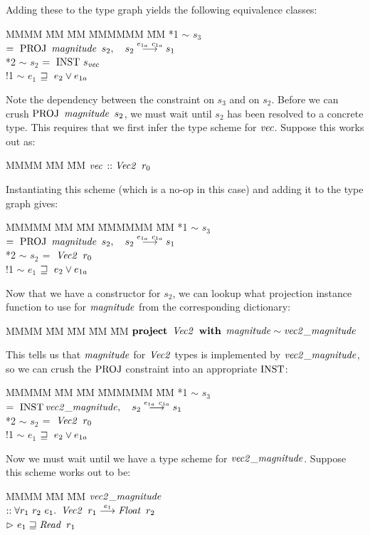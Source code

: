 Adding these to the type graph yields the following equivalence classes:
\begin{tabbing}
MMMM	\= MM 	\= MM 		\= MMMMMM 	\= MM \kill
	\> *1	\> $\sim$	\> $s_3$	\> $= \ \textrm{PROJ} \ \operatorname{\mathit{magnitude}} \ s_2, 
							\quad s_2 \stackrel{e_{1a} \ c_{1a}}{\longrightarrow} s_1$ \\
	\> *2	\> $\sim$	\> $s_2$	\> $= \ \textrm{INST} \ s_{\operatorname{\mathit{vec}}}$ \\
	\> !1	\> $\sim$	\> $e_1$	\> $\sqsupseteq \ e_2 \lor e_{1a}$
\end{tabbing}

Note the dependency between the constraint on $s_3$ and on $s_2$. Before we can crush $\rPROJ \ \imagnitude \ s_2$, we must wait until $s_2$ has been resolved to a concrete type. This requires that we first infer the type scheme for $\operatorname{\mathit{vec}}$. Suppose this works out as:
\begin{tabbing}
MMMM	\= MM \= MM \kill
	\> $\operatorname{\mathit{vec}}$ \> $:: \operatorname{\mathit{Vec2}} \ r_0$ 
\end{tabbing}
Instantiating this scheme (which is a no-op in this case) and adding it to the type graph gives:
\begin{tabbing}
MMMMM	\= MM 	\= MM 		\= MMMMMM 	\= MM \kill
	\> *1	\> $\sim$	\> $s_3$	\> $= \ \textrm{PROJ} \ \operatorname{\mathit{magnitude}} \ s_2, 
							\quad s_2 \stackrel{e_{1a} \ c_{1a}}{\longrightarrow} s_1$ \\
	\> *2	\> $\sim$	\> $s_2$	\> $= \ \operatorname{\mathit{Vec2}} \ r_0$ \\
	\> !1	\> $\sim$	\> $e_1$	\> $\sqsupseteq \ e_2 \lor e_{1a}$
\end{tabbing}
Now that we have a constructor for $s_2$, we can lookup what projection instance function to use for $\operatorname{\mathit{magnitude}}$ from the corresponding dictionary:
\begin{tabbing}
MMMM 	\= MM \= MM \= MM \= MM \kill
	\> $\kproject \ \iVecTwo \ \kwith$ $\operatorname{\mathit{magnitude}} \sim \operatorname{\mathit{vec2\_magnitude}}$ 
\end{tabbing}
This tells us that $\operatorname{\mathit{magnitude}}$ for $\operatorname{\mathit{Vec2}}$ types is implemented by $\operatorname{\mathit{vec2\_magnitude}}$, so we can crush the $\textrm{PROJ}$ constraint into an appropriate $\textrm{INST}$:
\begin{tabbing}
MMMMM	\= MM 	\= MM 		\= MMMMMM 	\= MM \kill
	\> *1	\> $\sim$	\> $s_3$	\> $= \ \textrm{INST} \operatorname{\mathit{vec2\_magnitude}}, 
							\quad s_2 \stackrel{e_{1a} \ c_{1a}}{\longrightarrow} s_1$ \\
	\> *2	\> $\sim$	\> $s_2$	\> $= \ \operatorname{\mathit{Vec2}} \ r_0$ \\
	\> !1	\> $\sim$	\> $e_1$	\> $\sqsupseteq \ e_2 \lor e_{1a}$
\end{tabbing}
Now we must wait until we have a type scheme for $\operatorname{\mathit{vec2\_magnitude}}$. Suppose this scheme works out to be:
\begin{tabbing}
MMMM	\= MM \= MM \kill
	\> $\operatorname{\mathit{vec2\_magnitude}}$ \\
	\> \> $:: \forall r_1 \ r_2 \ e_1. \ \operatorname{\mathit{Vec2}} \ r_1 \stackrel{e_1}{\longrightarrow} \operatorname{\mathit{Float}} \ r_2$ \\
	\> \> $\rhd \ e_1 \sqsupseteq \operatorname{\mathit{Read}} \ r_1$ 
\end{tabbing}

